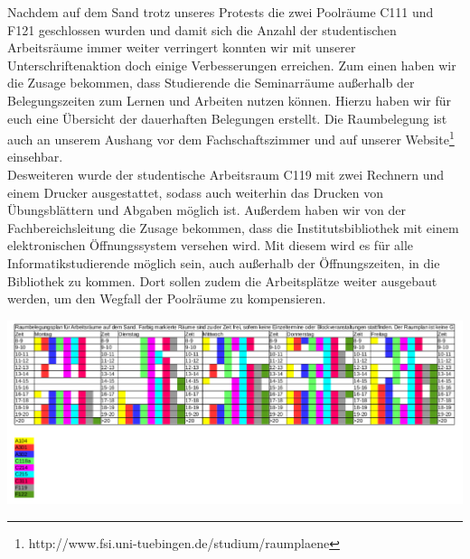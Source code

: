 Nachdem auf dem Sand trotz unseres Protests die zwei Poolräume C111 und F121 geschlossen wurden und damit sich die Anzahl der studentischen Arbeitsräume immer weiter verringert konnten wir mit unserer Unterschriftenaktion doch einige Verbesserungen erreichen. Zum einen haben wir die Zusage bekommen, dass Studierende die Seminarräume außerhalb der Belegungszeiten zum Lernen und Arbeiten nutzen können. Hierzu haben wir für euch eine Übersicht der dauerhaften Belegungen erstellt. Die Raumbelegung ist auch an unserem Aushang vor dem Fachschaftszimmer und auf unserer Website\footnote{http://www.fsi.uni-tuebingen.de/studium/raumplaene} einsehbar.\\
Desweiteren wurde der studentische Arbeitsraum C119 mit zwei Rechnern und einem Drucker ausgestattet, sodass auch weiterhin das Drucken von Übungsblättern und Abgaben möglich ist.
Außerdem haben wir von der Fachbereichsleitung die Zusage bekommen, dass die Institutsbibliothek mit einem elektronischen Öffnungssystem versehen wird. Mit diesem wird es für alle Informatikstudierende möglich sein, auch außerhalb der Öffnungszeiten, in die Bibliothek zu kommen. Dort sollen zudem die Arbeitsplätze weiter ausgebaut werden, um den Wegfall der Poolräume zu kompensieren.

\includegraphics[width=\textwidth]{content/pictures/Raumplan.pdf}
\newpage